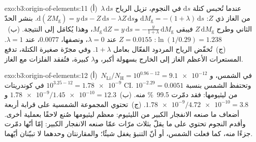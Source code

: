 \begin{solution}{exo:b3:origin-of-elements:11}
(أ)~عندما تُحبس كتلة $\mathrm{d}s$ في النجوم، تزيل الرياح
$\lambda\,\mathrm{d}s$ من الغاز ذي  $Z$:
$\mathrm{d}M_\mathrm{g} = -(1 + \lambda)\,\mathrm{d}s$
و$\mathrm{d}(ZM_\mathrm{g}) = y\,\mathrm{d}s - Z\,\mathrm{d}s -
\lambda Z\,\mathrm{d}s$. بنشر الحدّ الثاني وطرح
$Z\,\mathrm{d}M_\mathrm{g}$ فيبقى $M_\mathrm{g}\,\mathrm{d}Z =
y\,\mathrm{d}s = -\frac{y}{1 + \lambda}\,\mathrm{d}M_\mathrm{g}$، وهذا
يُكامَل إلى النتيجة. (ب)~$\ln(1/0.29) = 1.238$: $Z = 0.0155$ عند
$\lambda = 0$، ونصفها، $0.0077$، عند $\lambda = 1$. (ج)~تُخفّض الرياح
المردود الفعّال بعامل $1 + \lambda$. وفي مجرّة صغيرة الكتلة،
تدفع المستعرات الأعظم الغاز إلى الخارج بسهولة أكبر، و$\lambda$ كبيرة،
فتُفقد الفلزات مع الغاز.
\end{solution}

\begin{solution}{exo:b3:origin-of-elements:12}
(أ)~$N_\mathrm{Li}/N_\mathrm{H} = 10^{0.96 - 12} = \num{9.1e-12}$ في
الشمس، و$10^{3.25 - 12} = \num{1.78e-9}$ في كوندريتات CI. وتحتفظ الشمس
بنسبة $10^{-2.29} = \num{0.0051}$ من ليثيومها: فقد دمّرت
\qty{99.5}{\percent} منه. (ب)~$\num{1.78e-9}/\num{1.45e-10} = 12.3$
و$\num{1.78e-9}/\num{4.72e-10} = 3.8$. (ج)~تحتوي المجموعة الشمسية على قرابة
أربعة أضعاف ما صنعه الانفجار الكبير من الليثيوم: معظم ليثيومها
صُنع لاحقًا بعملية أخرى. وأقدم النجوم تحتوي على ما يقلّ بثلاث مرّات
عمّا صنعه الانفجار الكبير: إمّا أنّها دمّرت جزءًا منه، كما فعلت
الشمس، أو أنّ التنبؤ يغفل شيئًا؛ والمقارنتان
وحدهما لا تبيّنان أيّهما.
\end{solution}

